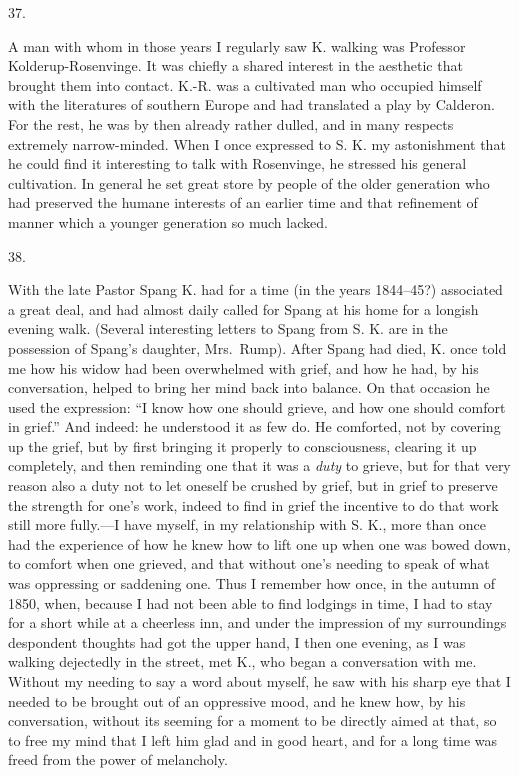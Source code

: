 \documentclass[12pt,a4paper,openany]{book}
\newcommand{\secnum}[1]{\par\begin{center}#1\end{center}\par\nobreak}
\newcommand{\opage}[1]{\marginnote{\footnotesize\textit{[#1]}}}
\begin{document}
\secnum{37.}

A man with whom in those years I regularly saw K.
walking was Professor Kolderup-Rosenvinge. It was
chiefly a shared interest in the aesthetic that brought
them into contact. K.-R. was a cultivated man who occupied
himself with the literatures of southern Europe and had
translated a play by Calderon. For the rest, he was by then
already rather dulled, and in many respects
extremely narrow-minded. When I once expressed to S. K. my
astonishment that he could find it interesting to talk
with Rosenvinge, he stressed his general cultivation.
In general he set great store by people of
the older generation who had preserved the humane interests
of an earlier time and that refinement of manner which a younger
generation so much lacked.

\secnum{38.}

With the late Pastor Spang K. had for a time (in the years
1844--45?) associated a great deal, and had almost daily
called for Spang at his home for a longish evening walk.
(Several interesting letters to Spang from S. K. are
in the possession of Spang's daughter, Mrs.~Rump). After Spang had died,
K. once told me how his widow had been
overwhelmed with grief, and how he had, by his
\opage{364}conversation, helped to bring her mind back into balance.
On that occasion he used the expression: ``I
know how one should grieve, and how one should
comfort in grief.'' And indeed: he understood it as few do.
He comforted, not by covering up the grief, but by
first bringing it properly to consciousness, clearing it up completely,
and then reminding one that it was a \emph{duty} to grieve,
but for that very reason also a duty not to let oneself be crushed
by grief, but in grief to preserve the strength for one's
work, indeed to find in grief the incentive to do that work
still more fully.---I have myself, in my
relationship with S. K., more than once had the experience of
how he knew how to lift one up when one was bowed down,
to comfort when one grieved, and that without one's
needing to speak of what was oppressing or saddening one.
Thus I remember how once, in the autumn of 1850, when,
because I had not been able to find lodgings in time,
I had to stay for a short while at a cheerless inn,
and under the impression of my surroundings despondent thoughts
had got the upper hand, I then one evening, as I was walking dejectedly
in the street, met K., who began a conversation
with me. Without my needing to say a word about
myself, he saw with his sharp eye that I needed
to be brought out of an oppressive mood, and he knew how,
by his conversation, without its seeming for a moment to be directly
aimed at that, so to free my mind that I left
him glad and in good heart, and for a long time was freed from
the power of melancholy.
\end{document}
